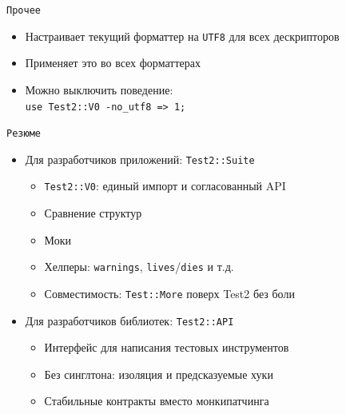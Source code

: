 \begin{frame}[fragile]{\texttt{Прочее}}
{\begin{itemize}
\begin{itemize}
                    \vspace{0.25em}
                    \item Настраивает текущий форматтер на \texttt{UTF8} для всех дескрипторов
                    \vspace{0.25em}
                    \item Применяет это во всех форматтерах
                    \vspace{0.25em}
                    \item Можно выключить поведение:\\ \texttt{use Test2::V0 -no\_utf8 => 1;}
            \end{itemize}
        \end{itemize}
    }
\end{frame}

\begin{frame}[fragile]{\texttt{Резюме}}
    \begin{itemize}
        \item Для разработчиков приложений: \texttt{Test2::Suite}
        \begin{itemize}
            \item \texttt{Test2::V0}: единый импорт и согласованный API
            \vspace{0.25em}
            \item Сравнение структур
            \vspace{0.25em}
            \item Моки
            \vspace{0.25em}
            \item Хелперы: \texttt{warnings}, \texttt{lives}/\texttt{dies} и т.д.
            \vspace{0.25em}
            \item Совместимость: \texttt{Test::More} поверх Test2 без боли
        \end{itemize}
        \vspace{0.5em}
        \item Для разработчиков библиотек: \texttt{Test2::API}
        \begin{itemize}
            \item Интерфейс для написания тестовых инструментов
            \vspace{0.25em}
            \item Без синглтона: изоляция и предсказуемые хуки
            \vspace{0.25em}
            \item Стабильные контракты вместо монкипатчинга
        \end{itemize}
    \end{itemize}
\end{frame}

